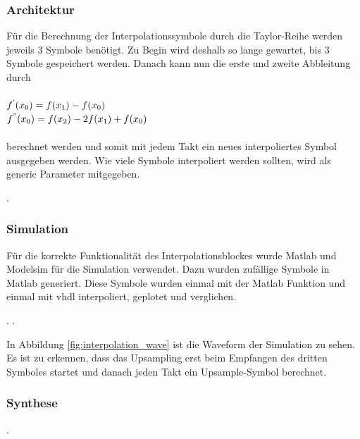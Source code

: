 \subsubsection{Architektur}
Für die Berechnung der Interpolationssymbole durch die Taylor-Reihe werden jeweils 3 Symbole benötigt. Zu Begin wird deshalb so lange gewartet, bis 3 Symbole gespeichert werden. Danach kann nun die erste und zweite Abbleitung durch
\\
\\
$f\textsuperscript{'}(x\textsubscript{0})=f(x\textsubscript{1})-f(x\textsubscript{0}) $\\
\noindent $f\textsuperscript{''}(x\textsubscript{0})=f(x\textsubscript{2})-2f(x\textsubscript{1})+f(x\textsubscript{0}) $
\\
\\
\noindent berechnet werden und somit mit jedem Takt ein neues interpoliertes Symbol ausgegeben werden. Wie viele Symbole interpoliert werden sollten, wird als generic Parameter mitgegeben.

.



\subsubsection{Simulation}

Für die korrekte Funktionalität des Interpolationsblockes wurde Matlab und Modelsim für die Simulation verwendet. Dazu wurden zufällige Symbole in Matlab generiert. Diese Symbole wurden einmal mit der Matlab Funktion und einmal mit vhdl interpoliert, geplotet und verglichen.


.
.

\noindent In Abbildung \ref{fig:interpolation_wave} ist die Waveform der Simulation zu sehen. Es ist zu erkennen, dass das Upsampling erst beim Empfangen des dritten Symboles startet und danach jeden Takt ein Upsample-Symbol berechnet.

\subsubsection{Synthese}
.

